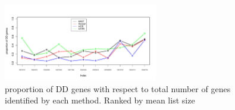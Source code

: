 \documentclass[11pt]{amsart}
\begin{document}

\begin{figure}[H]
\includegraphics[width = 0.6\textwidth]{Figs/DDprop.pdf}
 \caption{ proportion of DD genes with respect to total number of genes identified by each method. Ranked by mean list size}
  \label{fig:6}
\end{figure}
\end{document}

